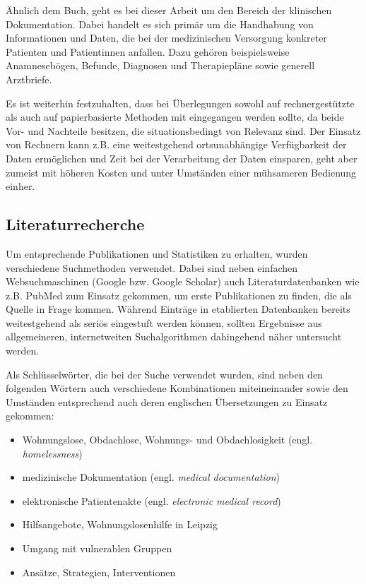 Ähnlich dem Buch, geht es bei dieser Arbeit um den Bereich der klinischen Dokumentation. Dabei handelt es sich primär um die Handhabung von Informationen und Daten, die bei der medizinischen Versorgung konkreter Patienten und Patientinnen anfallen. Dazu gehören beispielsweise Anamnesebögen, Befunde, Diagnosen und Therapiepläne sowie generell Arztbriefe.

Es ist weiterhin festzuhalten, dass bei Überlegungen sowohl auf rechnergestützte als auch auf papierbasierte Methoden mit eingegangen werden sollte, da beide Vor- und Nachteile besitzen, die situationsbedingt von Relevanz sind. Der Einsatz von Rechnern kann z.B. eine weitestgehend ortsunabhängige Verfügbarkeit der Daten ermöglichen und Zeit bei der Verarbeitung der Daten einsparen, geht aber zumeist mit höheren Kosten und unter Umständen einer mühsameren Bedienung einher.


\subsection{Literaturrecherche}

Um entsprechende Publikationen und Statistiken zu erhalten, wurden verschiedene Suchmethoden verwendet. Dabei sind neben einfachen Websuchmaschinen (Google bzw. Google Scholar) auch Literaturdatenbanken wie z.B. PubMed zum Einsatz gekommen, um erste Publikationen zu finden, die als Quelle in Frage kommen. Während Einträge in etablierten Datenbanken bereits weitestgehend als seriös eingestuft werden können, sollten Ergebnisse aus allgemeineren, internetweiten Suchalgorithmen dahingehend näher untersucht werden.

Als Schlüsselwörter, die bei der Suche verwendet wurden, sind neben den folgenden Wörtern auch verschiedene Kombinationen miteineinander sowie den Umständen entsprechend auch deren englischen Übersetzungen zu Einsatz gekommen:

\begin{itemize}
	\item Wohnungslose, Obdachlose, Wohnungs- und Obdachlosigkeit (engl. \textit{homelessness})
	\item medizinische Dokumentation (engl. \textit{medical documentation})
	\item elektronische Patientenakte (engl. \textit{electronic medical record})
	\item Hilfsangebote, Wohnungslosenhilfe in Leipzig
	\item Umgang mit vulnerablen Gruppen
	\item Ansätze, Strategien, Interventionen
\end{itemize}

